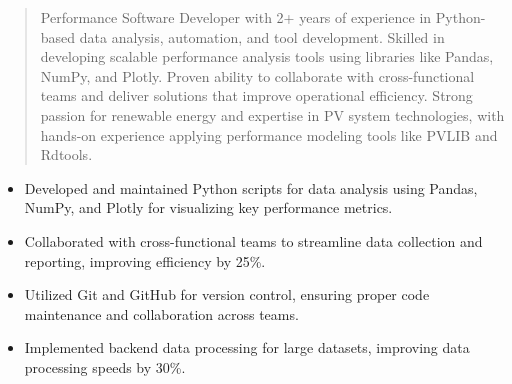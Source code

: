 



\makecvheader

\begin{quote}
  \noindent
  Performance Software Developer with 2+ years of experience in Python-based data analysis, automation, and tool development. Skilled in developing scalable performance analysis tools using libraries like Pandas, NumPy, and Plotly. Proven ability to collaborate with cross-functional teams and deliver solutions that improve operational efficiency. Strong passion for renewable energy and expertise in PV system technologies, with hands-on experience applying performance modeling tools like PVLIB and Rdtools.
\end{quote}

\par\smallskip
\noindent
\begin{minipage}{20cm}
  \begin{minipage}{9.75cm}
    \begin{itemize}
      \item Developed and maintained Python scripts for data analysis using Pandas, NumPy, and Plotly for visualizing key performance metrics.
      \item Collaborated with cross-functional teams to streamline data collection and reporting, improving efficiency by 25\%.
    \end{itemize}
  \end{minipage}
  \hfill
  \begin{minipage}{9.75cm}
    \begin{itemize}
      \item Utilized Git and GitHub for version control, ensuring proper code maintenance and collaboration across teams.
      \item Implemented backend data processing for large datasets, improving data processing speeds by 30\%.
    \end{itemize}
  \end{minipage}
\end{minipage}
\par\smallskip
\divider

